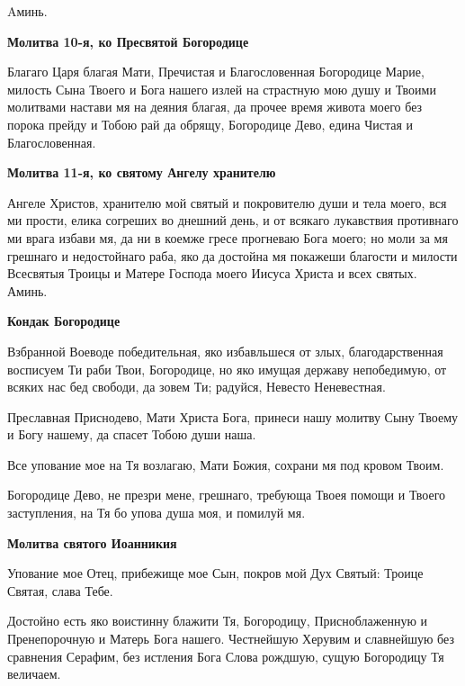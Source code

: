 Aминь.



 

\bfseries Молитва 10-я, ко Пресвятой Богородице\normalfont{}


   Благаго Царя благая Мати, Пречистая и Благословенная Богородице
Марие, милость Сына Твоего и Бога нашего излей на страстную мою душу и
Твоими молитвами настави мя на деяния благая, да прочее время живота
моего без порока прейду и Тобою рай да обрящу, Богородице Дево, едина
Чистая и Благословенная.



 

\bfseries Молитва 11-я, ко святому Ангелу хранителю\normalfont{}


   Ангеле Христов, хранителю мой святый и покровителю души и тела
моего, вся ми прости, елика согреших во днешний день, и от всякаго
лукавствия противнаго ми врага избави мя, да ни в коемже гресе прогневаю
Бога моего; но моли за мя грешнаго и недостойнаго раба, яко да достойна мя
покажеши благости и милости Всесвятыя Троицы и Матере Господа моего
Иисуса Христа и всех святых. Аминь.



 

\bfseries Кондак Богородице\normalfont{}


   Взбранной Воеводе победительная, яко избавльшеся от злых,
благодарственная восписуем Ти раби Твои, Богородице, но яко имущая
державу непобедимую, от всяких нас бед свободи, да зовем Ти; радуйся,
Невесто Неневестная.



   Преславная Приснодево, Мати Христа Бога, принеси нашу молитву Сыну
Твоему и Богу нашему, да спасет Тобою души наша.



   Все упование мое на Тя возлагаю, Мати Божия, сохрани мя под кровом
Твоим.



   Богородице Дево, не презри мене, грешнаго, требующа Твоея
помощи и Твоего заступления, на Тя бо упова душа моя, и помилуй
мя.




 

\bfseries Молитва святого Иоанникия\normalfont{}


   Упование мое Отец, прибежище мое Сын, покров мой Дух Святый:
Троице Святая, слава Тебе.



   Достойно есть яко воистинну блажити Тя, Богородицу, Присноблаженную и
Пренепорочную и Матерь Бога нашего. Честнейшую Херувим и славнейшую
без сравнения Серафим, без истления Бога Слова рождшую, сущую
Богородицу Тя величаем.




